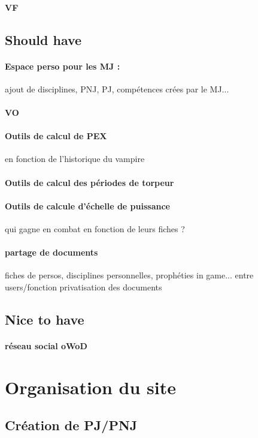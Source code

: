 \documentclass[12pt,a4paper]{article}
\begin{document}
\paragraph{VF}

\subsection{Should have}
\paragraph{Espace perso pour les MJ :} ajout de disciplines, PNJ, PJ, compétences crées par le MJ...
\paragraph{VO}
\paragraph{Outils de calcul de PEX} en fonction de l’historique du vampire
\paragraph{Outils de calcul des périodes de torpeur}
\paragraph{Outils de calcule d’échelle de puissance} qui gagne en combat en fonction de leurs fiches ?
\paragraph{partage de documents} fiches de persos, disciplines personnelles, prophéties in game... entre users/fonction privatisation des documents

\subsection{Nice to have}
\paragraph{réseau social oWoD}


\section{Organisation du site}

\subsection{Création de PJ/PNJ}
\end{document}
